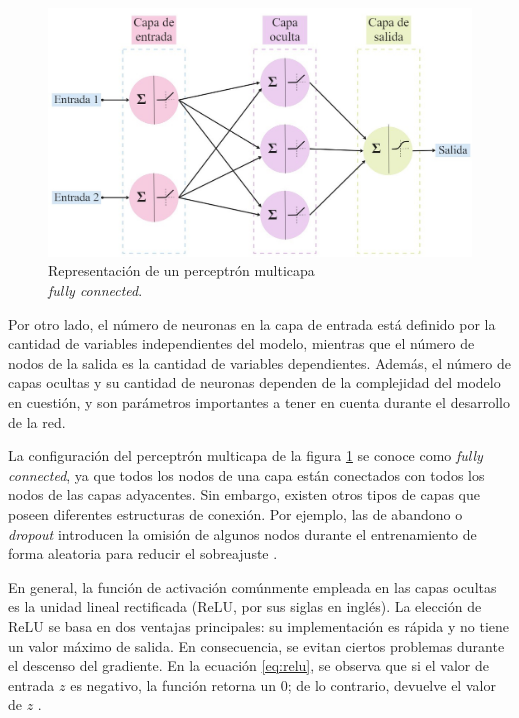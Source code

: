 \begin{figure}[h!]
	\centering
	\includegraphics[width=\textwidth]{./Figures/MLP.jpg}
	\caption{Representación de un perceptrón multicapa \\ \emph{fully connected}.}
	\label{fig:MLP}
\end{figure}

Por otro lado, el número de neuronas en la capa de entrada está definido por la cantidad de variables independientes 
del modelo, mientras que el número de nodos de la salida es la cantidad de variables dependientes. Además, el número de 
capas ocultas y su cantidad de neuronas dependen de la complejidad del modelo en cuestión, y son parámetros importantes 
a tener en cuenta durante el desarrollo de la red\citep{CITE:42}.

La configuración del perceptrón multicapa de la figura \ref{fig:MLP} se conoce como \emph{fully connected}, ya que todos 
los nodos de una capa están conectados con todos los nodos de las capas adyacentes. Sin embargo, existen otros tipos de 
capas que poseen diferentes estructuras de conexión. Por ejemplo, las de abandono o \emph{dropout} introducen la omisión de 
algunos nodos durante el entrenamiento de forma aleatoria para reducir el sobreajuste \citep{CITE:44} \citep{CITE:45}.

En general, la función de activación comúnmente empleada en las capas ocultas es la unidad lineal rectificada (ReLU, 
por sus siglas en inglés). La elección de ReLU se basa en dos ventajas principales: su implementación es rápida y no 
tiene un valor máximo de salida. En consecuencia, se evitan ciertos problemas durante el descenso del gradiente. En la 
ecuación \ref{eq:relu}, se observa que si el valor de entrada $z$ es negativo, la función retorna un 0; de lo contrario, 
devuelve el valor de $z$ \citep{CITE:44}. 

